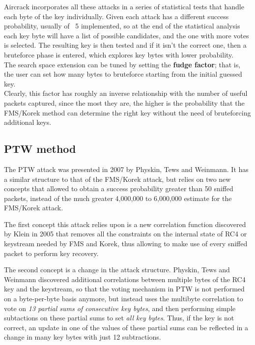 \documentclass[a4paper,12pt,titlepage]{article}
\begin{document}
Aircrack incorporates all these attacks in a series of statistical tests that
handle each byte of the key individually. Given each attack has a different
success probability, usually of ~5%
implemented, so at the end of the statistical analysis each key byte will have
a list of possible candidates, and the one with more votes is selected. The
resulting key is then tested and if it isn't the correct one, then a bruteforce
phase is entered, which explores key bytes with lower probability. \\
The search space extension can be tuned by setting the \textbf{fudge factor}; that is,
the user can set how many bytes to bruteforce starting from the initial guessed
key. \\
Clearly, this factor has roughly an inverse relationship with the number of useful
packets captured, since the most they are, the higher is the probability that the
FMS/Korek method can determine the right key without the need of bruteforcing
additional keys.

\subsection*{PTW method}
The PTW attack was presented in 2007 by Physkin, Tews and Weinmann. It has a
similar structure to that of the FMS/Korek attack, but relies on two new concepts that allowed to
obtain a success probability greater than 50%
sniffed packets, instead of the much greater 4,000,000 to 6,000,000 estimate
for the FMS/Korek attack.

The first concept this attack relies upon is a new correlation function
discovered by Klein in 2005 that removes all the constraints on the internal
state of RC4 or keystream needed by FMS and Korek, thus allowing to make use of
every sniffed packet to perform key recovery.

The second concept is a change in the attack structure. Physkin, Tews and Weinmann
discovered additional correlations between multiple bytes of the RC4 key and the
keystream, so that the voting mechanism in PTW is not performed on a
byte-per-byte basis anymore, but instead uses the multibyte correlation to vote
on \emph{13 partial sums of consecutive key bytes}, and then performing simple subtactions on
these partial sums to set \emph{all key bytes}. Thus, if the key is not correct, an
update in one of the values of these partial sums can be reflected in a change
in many key bytes with just 12 subtractions.
\end{document}
